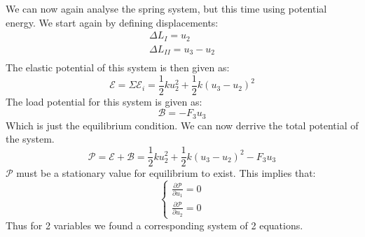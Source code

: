 \documentclass[11pt, a4paper]{article}
\numberwithin{equation}{section}
\numberwithin{figure}{section}
\begin{document}
We can now again analyse the spring system, but this time using potential energy. We start again by defining displacements:
\begin{gather}
  \Delta L_I = u_2\\
  \Delta L_{II} = u_3 - u_2\\
\end{gather}
The elastic potential of this system is then given as:
\begin{equation}
  \mathcal{E} = \Sigma\mathcal{E}_i = \frac{1}{2}k u_2^2 + \frac{1}{2}k (u_3 - u_2)^2
\end{equation}
The load potential for this system is given as:
\begin{equation}
  \mathcal{B} = -F_3u_3
\end{equation}
Which is just the equilibrium condition. We can now derrive the total potential of the system.
\begin{equation}
  \mathcal{P} = \mathcal{E} + \mathcal{B} = \frac{1}{2}k u_2^2 + \frac{1}{2}k (u_3 - u_2)^2 - F_3u_3
\end{equation}
$\mathcal{P}$ must be a stationary value for equilibrium to exist. This implies that:
\begin{equation}
  \begin{cases}
    \frac{\partial \mathcal{P}}{\partial u_1} = 0\\
    \frac{\partial \mathcal{P}}{\partial u_2} = 0
  \end{cases}
\end{equation}
Thus for 2 variables we found a corresponding system of 2 equations.
\end{document}
